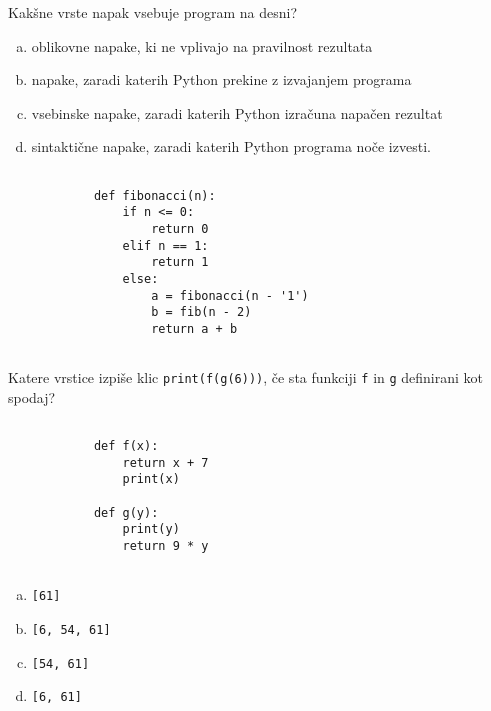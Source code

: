 \documentclass[arhiv, 10pt]{../izpit}
\newcommand{\inlinepy}[1]{\texttt{#1}}
\begin{document}
        \naloga*
        \begin{multicols}{2}
        \noindent
        Kakšne vrste napak vsebuje program na desni?

        \begin{enumerate}[(a)]
\item oblikovne napake, ki ne vplivajo na pravilnost rezultata
\item napake, zaradi katerih Python prekine z izvajanjem programa
\item vsebinske napake, zaradi katerih Python izračuna napačen rezultat
\item sintaktične napake, zaradi katerih Python programa noče izvesti.
\end{enumerate}

        \columnbreak

        \begin{verbatim}
        
            def fibonacci(n):
                if n <= 0:
                    return 0
                elif n == 1:
                    return 1
                else:
                    a = fibonacci(n - '1')
                    b = fib(n - 2)
                    return a + b
            
        \end{verbatim}

        \end{multicols}

    
        \naloga*
        Katere vrstice izpiše klic \inlinepy{print(f(g(6)))}, če sta funkciji \inlinepy{f} in \inlinepy{g} definirani kot spodaj?

        \begin{multicols}{2}
        \begin{verbatim}
        
            def f(x):
                return x + 7
                print(x)

            def g(y):
                print(y)
                return 9 * y
        
        \end{verbatim}

        \begin{enumerate}[(a)]
\item \inlinepy{[61]}
\item \inlinepy{[6, 54, 61]}
\item \inlinepy{[54, 61]}
\item \inlinepy{[6, 61]}
\end{enumerate}

        \end{multicols}
    
\end{document}
